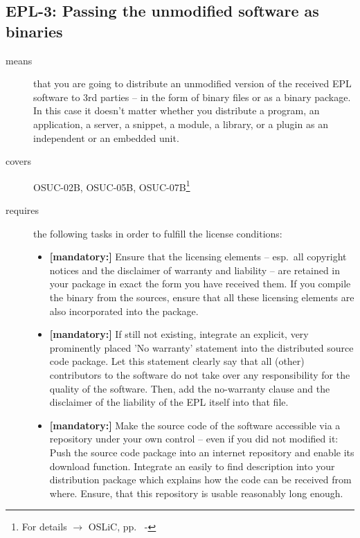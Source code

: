 \subsection{EPL-3: Passing the unmodified software as binaries} 
\label{OSUC-02B-EPL} \label{OSUC-05B-EPL} \label{OSUC-07B-EPL} 

\begin{description}
\item[means] that you are going to distribute an unmodified version of the
received EPL software to 3rd parties -- in the form of binary files or as a
bi\-na\-ry package. In this case it doesn't matter whether you distribute a
program, an application, a server, a snippet, a module, a library, or a plugin
as an independent or an embedded unit.

\item[covers] OSUC-02B, OSUC-05B, OSUC-07B\footnote{For details $\rightarrow$
OSLiC, pp.\ \pageref{OSUC-02B-DEF} - \pageref{OSUC-07B-DEF}}

\item[requires] the following tasks in order to fulfill the license conditions:
\begin{itemize}
  
  \item \textbf{[mandatory:]} Ensure that the licensing elements -- esp.\ all
  copyright notices and the disclaimer of warranty and liability -- are retained
  in your package in exact the form you have received them. If you compile the
  binary from the sources, ensure that all these licensing elements are also
  incorporated into the package.
  
  \item \textbf{[mandatory:]} If still not existing, integrate an explicit, very
  prominently placed 'No warranty' statement into the distributed source code
  package. Let this statement clearly say that all (other) contributors to the
  software do not take over any responsibility for the quality of the software.
  Then, add the no-warranty clause and the disclaimer of the liability of the
  EPL itself into that file.

  \item \textbf{[mandatory:]} Make the source code of the software accessible
  via a repository under your own control -- even if you did not modified it:
  Push the source code package into an internet repository and enable its
  download function. Integrate an easily to find description into your
  distribution package which explains how the code can be received from where.
  Ensure, that this repository is usable reasonably long enough.
  

\end{itemize}
\end{description}
